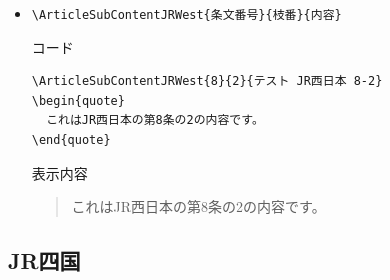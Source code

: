 \documentclass[oneside,10pt,a4paper]{jsarticle}
\begin{document}
\begin{itemize}
\begin{itembox}[l]{表示内容}
      \end{itembox}
    \item \verb|\ArticleSubContentJRWest{条文番号}{枝番}{内容}|
      \begin{itembox}[l]{コード}
        \begin{verbatim}
\ArticleSubContentJRWest{8}{2}{テスト JR西日本 8-2}
\begin{quote}
  これはJR西日本の第8条の2の内容です。
\end{quote}\end{verbatim}
      \end{itembox}
      \begin{itembox}[l]{表示内容}
        \begin{quote}
          これはJR西日本の第8条の2の内容です。
        \end{quote}
      \end{itembox}
  \end{itemize}

  \newpage

  \subsection{JR四国}
\end{document}
